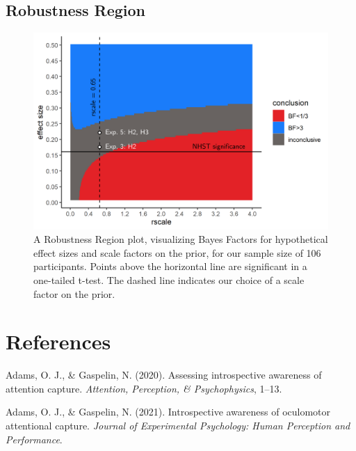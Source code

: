 \documentclass[12pt,twoside]{reedthesis}
\begin{document}
\hypertarget{robustness-region}{%
\section{Robustness Region}\label{robustness-region}}
\begin{figure}
\includegraphics[width=1\linewidth]{figure/asymmetry/RR} \caption[Robustness region]{A Robustness Region plot, visualizing Bayes Factors for hypothetical effect sizes and scale factors on the prior, for our sample size of 106 participants. Points above the horizontal line are significant in a one-tailed t-test. The dashed line indicates our choice of a scale factor on the prior.}\label{fig:app5-RR}
\end{figure}
\backmatter

\hypertarget{references}{%
\chapter*{References}\label{references}}


\noindent

\setlength{\parindent}{-0.20in}
\setlength{\leftskip}{0.20in}
\setlength{\parskip}{8pt}

\hypertarget{refs}{}
\leavevmode\hypertarget{ref-adams2020assessing}{}%
Adams, O. J., \& Gaspelin, N. (2020). Assessing introspective awareness of attention capture. \emph{Attention, Perception, \& Psychophysics}, 1--13.

\leavevmode\hypertarget{ref-adams2021introspective}{}%
Adams, O. J., \& Gaspelin, N. (2021). Introspective awareness of oculomotor attentional capture. \emph{Journal of Experimental Psychology: Human Perception and Performance}.
\end{document}
